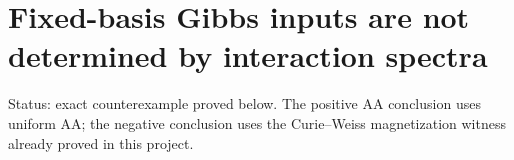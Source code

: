 \section{Fixed-basis Gibbs inputs are not determined by interaction
spectra}\label{proof:quantum_interactions}

Status: exact counterexample proved below. The positive AA conclusion
uses uniform AA; the negative conclusion uses the Curie--Weiss
magnetization witness already proved in this project.







